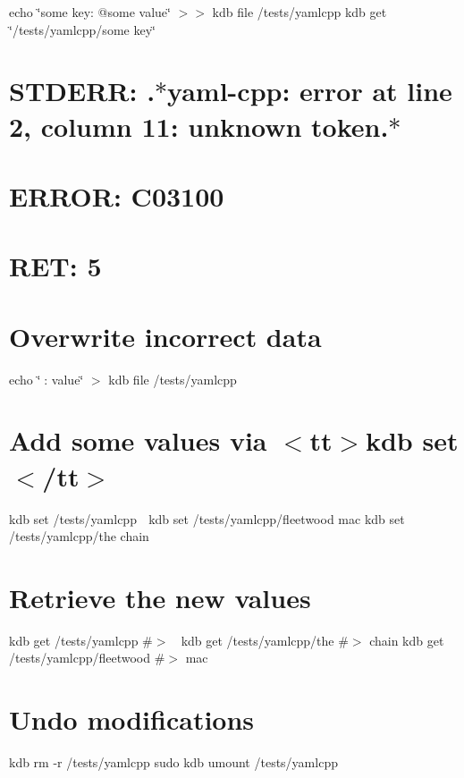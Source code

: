 echo \char`\"{}some key\+: @some  value\char`\"{} $>$$>$ {\ttfamily kdb file /tests/yamlcpp} kdb get \char`\"{}/tests/yamlcpp/some key\char`\"{} \hypertarget{autotoc_md780_autotoc_md787}{}\section{S\+T\+D\+E\+R\+R\+: .$\ast$yaml-\/cpp\+: error at line 2, column 11\+: unknown token.$\ast$}\label{autotoc_md780_autotoc_md787}
\hypertarget{autotoc_md780_autotoc_md788}{}\section{E\+R\+R\+O\+R\+: C03100}\label{autotoc_md780_autotoc_md788}
\hypertarget{autotoc_md780_autotoc_md789}{}\section{R\+E\+T\+: 5}\label{autotoc_md780_autotoc_md789}
\hypertarget{autotoc_md780_autotoc_md790}{}\section{Overwrite incorrect data}\label{autotoc_md780_autotoc_md790}
echo \char`\"{}🔑\+: value\char`\"{} $>$ {\ttfamily kdb file /tests/yamlcpp}\hypertarget{autotoc_md780_autotoc_md791}{}\section{Add some values via $<$tt$>$kdb set$<$/tt$>$}\label{autotoc_md780_autotoc_md791}
kdb set /tests/yamlcpp 🎵 kdb set /tests/yamlcpp/fleetwood mac kdb set /tests/yamlcpp/the chain\hypertarget{autotoc_md780_autotoc_md792}{}\section{Retrieve the new values}\label{autotoc_md780_autotoc_md792}
kdb get /tests/yamlcpp \#$>$ 🎵 kdb get /tests/yamlcpp/the \#$>$ chain kdb get /tests/yamlcpp/fleetwood \#$>$ mac\hypertarget{autotoc_md780_autotoc_md793}{}\section{Undo modifications}\label{autotoc_md780_autotoc_md793}
kdb rm -\/r /tests/yamlcpp sudo kdb umount /tests/yamlcpp 
\begin{DoxyCode}{0}
\DoxyCodeLine{}

\end{DoxyCode}$$
